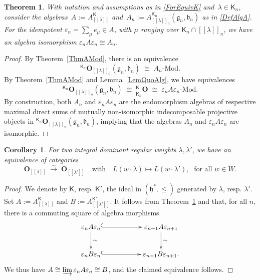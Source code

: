 \documentclass[11pt]{amsart}
\newcommand{\lbra}{[\![}
\newcommand{\rbra}{]\!]}
\newcommand{\KKK}{\mathsf{K}}
\newcommand{\bO}{\mathbf{O}}
\newcommand{\fg}{\mathfrak{g}}
\newcommand{\fh}{\mathfrak{h}}
\newcommand{\fb}{\mathfrak{b}}
\numberwithin{equation}{section}
\theoremstyle{plain}
\newtheorem{cor}[subsubsection]{Corollary}
\newtheorem{thm}[subsubsection]{Theorem}
\theoremstyle{remark}
\theoremstyle{remark}
\theoremstyle{construction}
\begin{document}
\begin{thm}\label{Thmidemptr}
With notation and assumptions as in \ref{ForEquivK} and~$\lambda\in\KKK_n$, consider the algebras~$A:=A^{\KKK}_{\lbra\lambda\rbra}$ and~$A_n:=A^{\KKK_n}_{\lbra\lambda\rbra_n}(\fg_n,\fb_n)$ as in \ref{DefAlgA}. For the idempotent $\varepsilon_n=\sum_{\mu}e_\mu\in A$, with $\mu$ ranging over $\KKK_n\cap\lbra\lambda\rbra_n$, we have an algebra isomorphism $\varepsilon_nA\varepsilon_n\cong A_n$.
\end{thm}
\begin{proof}
By Theorem~\ref{ThmAMod}, {there is} an equivalence
$${}^{\KKK_n}\bO_{\lbra\lambda\rbra_n}(\fg_n,\fb_n)\;\cong\;A_n\mbox{-Mod}.$$
By Theorem~\ref{ThmAMod} and Lemma~\ref{LemQuoAlg}, we have equivalences
$${}^{\KKK_n}\bO_{\lbra\lambda\rbra_n}(\fg_n,\fb_n)\;\cong\;{}^{\KKK}_{\mathring{\KKK}_n}\bO\;\cong\;\varepsilon_n A\varepsilon_n\mbox{-Mod}.$$
By construction, both $A_n$ and $\varepsilon_nA\varepsilon_n$ are the endomorphism algebra{s} of {respective maximal} direct sum{s} of {mutually non-isomorphic} indecomposable projective objects in ${}^{\KKK_n}\bO_{\lbra\lambda\rbra_n}(\fg_n,\fb_n)$, implying that {the algebras $A_n$  and $\varepsilon_n A \varepsilon_n$} are isomorphic.
\end{proof}


\begin{cor}
For two integral dominant regular weights $\lambda,\lambda'$, we have an equivalence of categories
$$\bO_{\lbra\lambda\rbra}\;\stackrel{\sim}{\to}\;\bO_{\lbra\lambda'\rbra}\quad\mbox{with}\quad L(w\cdot\lambda)\mapsto L(w\cdot\lambda'),\;\mbox{ for all $w\in W$.}$$
\end{cor}
\begin{proof}
We denote by $\KKK$, resp. $\KKK'$, the ideal in $(\fh^\ast,\le)$ generated by $\lambda$, resp. $\lambda'$. Set $A:=A^{\KKK}_{\lbra\lambda\rbra}$ and $B:=A^{\KKK'}_{\lbra\lambda'\rbra}$. It follows from Theorem~\ref{Thmidemptr} and \cite[Proposition~7.8]{Humphreys} that, for all $n$, {there is} a commuting square of algebra morphisms
$$\xymatrix{
\varepsilon_n A\varepsilon_n\ar@{^{(}->}[rr]\ar[d]^{\sim}&& \varepsilon_{n+1} A\varepsilon_{n+1}\ar[d]^{\sim}\\
\varepsilon_n B\varepsilon_n\ar@{^{(}->}[rr]&& \varepsilon_{n+1}B\varepsilon_{n+1}.
}$$
We thus have $A\cong\varinjlim \varepsilon_n A\varepsilon_n\cong B${,} and the {claimed} equivalence follows.
\end{proof}

\end{document}
